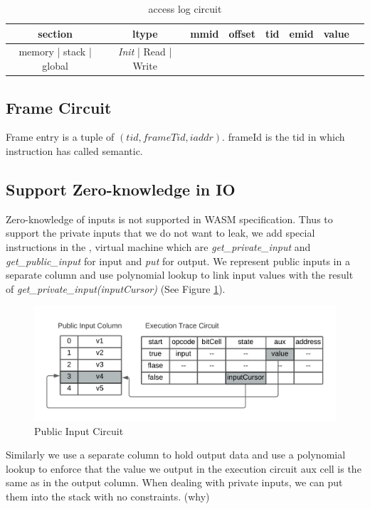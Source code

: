 \begin{table}[!h]
\begin{center}
\begin{tabular}{ | c | c | c | c | c | c | c | c |}
  \hline
  section & ltype & mmid & offset & tid & emid & value\\ 
  \hline
  memory | stack | global & \emph{Init} | Read | Write & & & & &\\
 \hline
\end{tabular}
\caption{access log circuit}
\label{tbl: rw-circuit}
\end{center}
\end{table}

\subsection{Frame Circuit}
\label{chp:frame-circuit}
Frame entry is a tuple of $(tid, frameTid, iaddr)$. 
frameId is the tid in which instruction has called semantic. 
\subsection{Support Zero-knowledge in IO}
Zero-knowledge of inputs is not supported in WASM specification. Thus to support the private inputs that we do not want to leak, we add special instructions in the \zkwasm, virtual machine which are \emph{get\_private\_input} and \emph{get\_public\_input} for input and \emph{put} for output. We represent public inputs in a separate column and use polynomial lookup to link input values with the result of \emph{get\_private\_input(inputCursor)} (See Figure \ref{fig:public-input}).

\begin{figure}[!ht]
\centerline{
\includegraphics[scale=0.8]{figs/public-input.png}
}
\caption{Public Input Circuit}\label{fig:public-input}
\end{figure}
 Similarly we use a separate column to hold output data and use a polynomial lookup to enforce that the value we output in the execution circuit aux cell is the same as in the output column. When dealing with private inputs, we can put them into the stack with no constraints. (why)
